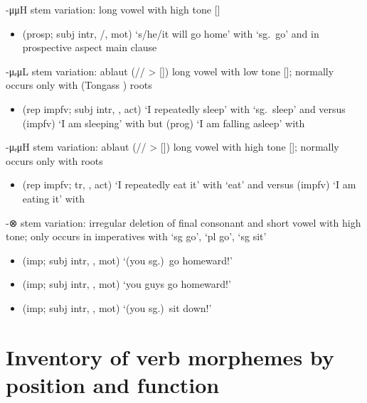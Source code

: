 \documentclass[12pt,letterpaper,oneside,article]{memoir}
\begin{document}
\begin{morphdesc}[resume*=alphalist]
\item[-μμH]
	stem variation: long vowel with high tone []
	\begin{itemize}
	\item	{} (prosp; subj intr, /, mot) ‘s/he/it will go home’
		with  ‘sg.\ go’ and 
		in prospective aspect main clause
	\end{itemize}

\item[-μₑμL]
	stem variation: ablaut (// > []) long vowel with low tone [];
	normally occurs only with  (Tongass ) roots
	\begin{itemize}
	\item	{} (rep impfv; subj intr, ,  act) ‘I repeatedly sleep’
			with  ‘sg.\ sleep’ and \newline
		versus
		 (impfv) ‘I am sleeping’
			with \newline
		but  (prog) ‘I am falling asleep’
			with 
	\end{itemize}

\item[-μₑμH]
	stem variation: ablaut (// > []) long vowel with high tone [];
	normally occurs only with  roots
	\begin{itemize}
	\item	{} (rep impfv; tr, ,  act) ‘I repeatedly eat it’
			with  ‘eat’ and \newline
		versus
		 (impfv) ‘I am eating it’
			with 
	\end{itemize}

\item[-⊗]
	stem variation: irregular deletion of final consonant and short vowel with high tone;
	only occurs in imperatives with  ‘sg go’,
			 ‘pl go’,
			 ‘sg sit’
	\begin{itemize}
	\item	{} (imp; subj intr, , mot) ‘(you sg.)\ go homeward!’
	\item	{} (imp; subj intr, , mot) ‘you guys go homeward!’
	\item	{} (imp; subj intr, , mot) ‘(you sg.)\ sit down!’
	\end{itemize}
\end{morphdesc}

\clearpage
\section{Inventory of verb morphemes by position and function}\label{sec:inventory}


\clearpage
\raggedyright
\printbibliography\label{sec:bibliography} 
\end{document}
